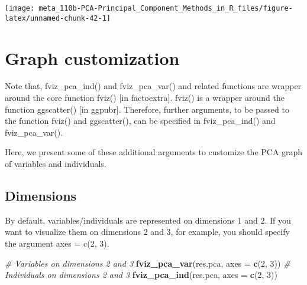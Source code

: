 \documentclass[]{book}
\newenvironment{Shaded}{\begin{snugshade}}{\end{snugshade}}
\newcommand{\CommentTok}[1]{\textcolor[rgb]{0.56,0.35,0.01}{\textit{#1}}}
\newcommand{\DataTypeTok}[1]{\textcolor[rgb]{0.13,0.29,0.53}{#1}}
\newcommand{\DecValTok}[1]{\textcolor[rgb]{0.00,0.00,0.81}{#1}}
\newcommand{\KeywordTok}[1]{\textcolor[rgb]{0.13,0.29,0.53}{\textbf{#1}}}
\newcommand{\NormalTok}[1]{#1}
\newcommand{\OperatorTok}[1]{\textcolor[rgb]{0.81,0.36,0.00}{\textbf{#1}}}
\newcommand{\OtherTok}[1]{\textcolor[rgb]{0.56,0.35,0.01}{#1}}
\newcommand{\StringTok}[1]{\textcolor[rgb]{0.31,0.60,0.02}{#1}}
\begin{document}
\begin{Shaded}
\end{Shaded}

\begin{center}\texttt{[image: meta\_110b-PCA-Principal\_Component\_Methods\_in\_R\_files/figure-latex/unnamed-chunk-42-1]} \end{center}

\hypertarget{graph-customization}{%
\section{Graph customization}\label{graph-customization}}

Note that, fviz\_pca\_ind() and fviz\_pca\_var() and related functions are wrapper around the core function fviz() {[}in factoextra{]}. fviz() is a wrapper around the function ggscatter() {[}in ggpubr{]}. Therefore, further arguments, to be passed to the function fviz() and ggscatter(), can be specified in fviz\_pca\_ind() and fviz\_pca\_var().

Here, we present some of these additional arguments to customize the PCA graph of variables and individuals.

\hypertarget{dimensions}{%
\subsection{Dimensions}\label{dimensions}}

By default, variables/individuals are represented on dimensions 1 and 2. If you want to visualize them on dimensions 2 and 3, for example, you should specify the argument axes = c(2, 3).

\begin{Shaded}
\begin{Highlighting}[]
\CommentTok{# Variables on dimensions 2 and 3}
\KeywordTok{fviz_pca_var}\NormalTok{(res.pca, }\DataTypeTok{axes =} \KeywordTok{c}\NormalTok{(}\DecValTok{2}\NormalTok{, }\DecValTok{3}\NormalTok{))}
\CommentTok{# Individuals on dimensions 2 and 3}
\KeywordTok{fviz_pca_ind}\NormalTok{(res.pca, }\DataTypeTok{axes =} \KeywordTok{c}\NormalTok{(}\DecValTok{2}\NormalTok{, }\DecValTok{3}\NormalTok{))}
\end{Highlighting}
\end{Shaded}
\end{document}
